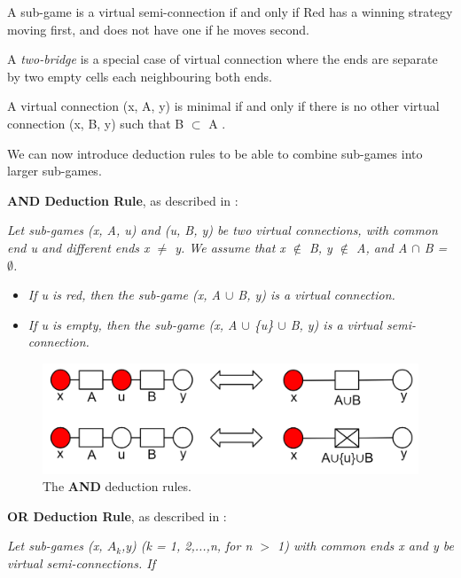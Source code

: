 \begin{defn} \normalfont A sub-game is a virtual semi-connection if and only if Red has a winning strategy
moving first, and does not have one if he moves second. \cite{HierarchicalHex}\end{defn}

A \textit{two-bridge} is a special case of virtual connection where the ends are separate by two empty cells each neighbouring both ends.



A virtual connection (x, A, y) is minimal if and only if there is no other virtual connection (x, B, y) such that B $\subset$ A \cite{HierarchicalHex}.

We can now introduce deduction rules to be able to combine sub-games into larger sub-games. 

\textbf{AND Deduction Rule}, as described in \cite{HierarchicalHex}:

\textit{Let sub-games (x, A, u) and (u, B, y) be two virtual
connections, with common end u and different ends x $\neq$ y. We assume that x $\notin$ B, y $\notin$ A,
and A $\cap$ B = $\emptyset$.}
\begin{itemize}
    \item \textit{If u is red, then the sub-game (x, A $\cup$ B, y) is a virtual connection.}
    \item \textit{If u is empty, then the sub-game (x, A $\cup$ \{u\} $\cup$ B, y) is a virtual semi-connection.}
\end{itemize}



\begin{figure}
    \centering
    \includegraphics[scale = 0.2]{images/AND_deduction.png}
    \caption{The \textbf{AND} deduction rules. }
    \label{fig:and_deduction}
\end{figure}


\textbf{OR Deduction Rule}, as described in \cite{HierarchicalHex}:

\textit{Let sub-games (x, $A_k$,y) (k = 1, 2,...,n, for n $>$ 1) with common ends x and y be virtual semi-connections. If}

